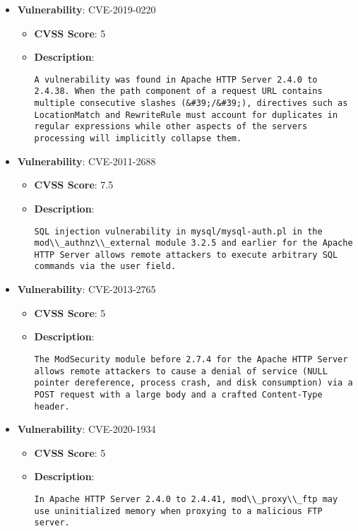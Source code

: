 \documentclass{article}
\begin{document}
\begin{itemize}
        \item \textbf{Vulnerability}: CVE-2019-0220
        \begin{itemize}
            \item \textbf{CVSS Score}:  5 
            \item \textbf{Description}:
            \parbox[t]{0.9\linewidth}{
                \verb|A vulnerability was found in Apache HTTP Server 2.4.0 to 2.4.38. When the path component of a request URL contains multiple consecutive slashes (&#39;/&#39;), directives such as LocationMatch and RewriteRule must account for duplicates in regular expressions while other aspects of the servers processing will implicitly collapse them.|
            }
        \end{itemize}
    
        \item \textbf{Vulnerability}: CVE-2011-2688
        \begin{itemize}
            \item \textbf{CVSS Score}:  7.5 
            \item \textbf{Description}:
            \parbox[t]{0.9\linewidth}{
                \verb|SQL injection vulnerability in mysql/mysql-auth.pl in the mod\\_authnz\\_external module 3.2.5 and earlier for the Apache HTTP Server allows remote attackers to execute arbitrary SQL commands via the user field.|
            }
        \end{itemize}
    
        \item \textbf{Vulnerability}: CVE-2013-2765
        \begin{itemize}
            \item \textbf{CVSS Score}:  5 
            \item \textbf{Description}:
            \parbox[t]{0.9\linewidth}{
                \verb|The ModSecurity module before 2.7.4 for the Apache HTTP Server allows remote attackers to cause a denial of service (NULL pointer dereference, process crash, and disk consumption) via a POST request with a large body and a crafted Content-Type header.|
            }
        \end{itemize}
    
        \item \textbf{Vulnerability}: CVE-2020-1934
        \begin{itemize}
            \item \textbf{CVSS Score}:  5 
            \item \textbf{Description}:
            \parbox[t]{0.9\linewidth}{
                \verb|In Apache HTTP Server 2.4.0 to 2.4.41, mod\\_proxy\\_ftp may use uninitialized memory when proxying to a malicious FTP server.|
            }
        \end{itemize}
    

\end{itemize}
\end{document}
